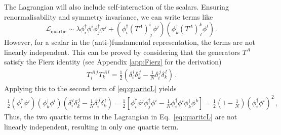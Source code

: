 The Lagrangian will also include self-interaction of the scalars. Ensuring renormalisability and symmetry invariance, we can write terms like
\begin{equation}
    \mathcal{L}_{\text{quartic}}\sim 
    \lambda \phi^\dagger_i \phi^i \phi^\dagger_j \phi^j + (\phi_i^\dagger (T^A)^i_{\,j}\phi^j)(\phi_k^\dagger (T^A)^k_{\,l}\phi^l)\,.\label{eq:quaritcL}
\end{equation}
However, for a scalar in the (anti-)fundamental representation, the terms are not linearly independent. This can be proved by considering that the generators $T^A$ satisfy the Fierz identity (see Appendix \ref{app:Fierz} for the derivation)
\begin{align}
    T_i ^{\,A\,j}T_k ^{\,A\,l}=\frac{1}{2}\left(\delta_i^{\,l}\delta_k^{\,j}-\frac{1}{N}\delta_i^{\,j}\delta_k^{\,l}\right) \,.
\end{align}
Applying this to the second term of \eqref{eq:quaritcL} yields
\begin{align}
    \frac{1}{2} (\phi_i^\dagger \phi^j)(\phi_k^\dagger \phi^l)\left(\delta_i^{\,l}\delta_k^{\,j}-\frac{1}{N}\delta_i^{\,j}\delta_k^{\,l}\right)=\frac{1}{2}\left[\phi^{\dagger}_i \phi^j \phi^{\dagger}_j \phi^i-\frac{1}{N}\phi^{\dagger}_i \phi^i \phi^{\dagger}_k \phi^k\right]=\frac{1}{2}\left(1-\frac{1}{N}\right) (\phi^{\dagger}_i \phi^i)^2\,,
\end{align}
Thus, the two quartic terms in the Lagrangian in Eq.~\eqref{eq:quaritcL} are not linearly independent, resulting in only one quartic term. 

